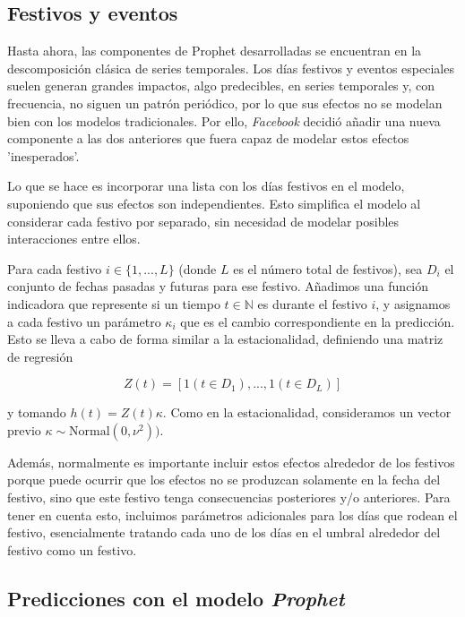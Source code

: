 \documentclass[12pt,twoside]{article}
\begin{document}
\subsection{Festivos y eventos}\label{sec:6}

Hasta ahora, las componentes de Prophet desarrolladas se encuentran en la descomposición clásica de series temporales. Los días festivos y eventos especiales suelen generan grandes impactos, algo predecibles, en series temporales y, con frecuencia, no siguen un patrón periódico, por lo que sus efectos no se modelan bien con los modelos tradicionales. Por ello, \textit{Facebook} decidió añadir una nueva componente a las dos anteriores que fuera capaz de modelar estos efectos 'inesperados'.

Lo que se hace es incorporar una lista con los días festivos en el modelo, suponiendo que sus efectos son independientes. Esto simplifica el modelo al considerar cada festivo por separado, sin necesidad de modelar posibles interacciones entre ellos.

Para cada festivo $i \in \{1,..., L\}$ (donde $L$ es el número total de festivos), sea $D_i$ el conjunto de fechas pasadas y futuras para ese festivo. Añadimos una función indicadora que represente si un tiempo $t \in \mathbb{N}$ es durante el festivo $i$, y asignamos a cada festivo un parámetro $\kappa_i$ que es el cambio correspondiente en la predicción. Esto se lleva a cabo de forma similar a la estacionalidad, definiendo una matriz de regresión 

\begin{equation}
Z(t) = [1(t \in D_1),...,1(t \in D_L)]
\end{equation}

y tomando $h(t) = Z(t) \kappa$. Como en la estacionalidad, consideramos un vector previo $\kappa \sim \text{Normal}(0, \nu^2))$. 

Además, normalmente es importante incluir estos efectos alrededor de los festivos porque puede ocurrir que los efectos no se produzcan solamente en la fecha del festivo, sino que este festivo tenga consecuencias posteriores y/o anteriores. Para tener en cuenta esto, incluimos parámetros adicionales para los días que rodean el festivo, esencialmente tratando cada uno de los días en el umbral alrededor del festivo como un festivo.


\subsection{Predicciones con el modelo \textit{Prophet}}\label{sec:7}
\end{document}
